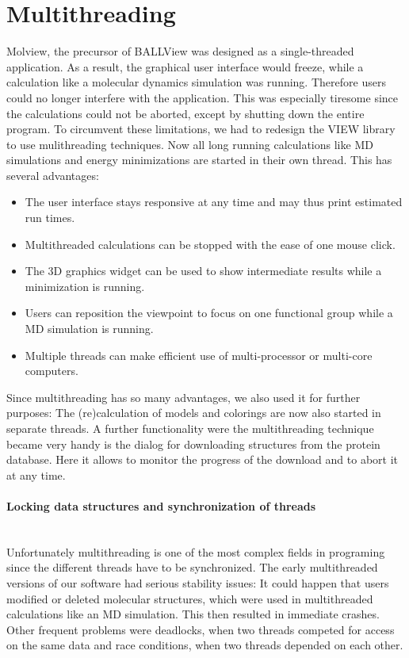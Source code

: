 \section{Multithreading}\label{mthread}
Molview, the precursor of BALLView was designed as a single-threaded 
application. As a result, the graphical user interface would freeze, while a 
calculation like a molecular dynamics simulation was running. Therefore users 
could no longer interfere with the application. This was especially tiresome 
since the calculations could not be aborted, except by shutting down the 
entire program. To circumvent these limitations, we had to redesign the VIEW 
library to use mulithreading techniques. Now all long running calculations 
like MD simulations and energy minimizations are started in their own thread.
This has several advantages:
\begin{itemize}
  \item The user interface stays responsive at any time and may thus \eg print
        estimated run times.
  \item Multithreaded calculations can be stopped with the ease of one mouse
        click.
  \item The 3D graphics widget can be used to show intermediate results \eg 
        while a minimization is running.
  \item Users can reposition the viewpoint \eg to focus on one functional group
        while a MD simulation is running.
  \item Multiple threads can make efficient use of multi-processor or multi-core
        computers.
\end{itemize}

Since multithreading has so many advantages, we also used it for further 
purposes: The (re)calculation of models and colorings are now also started in 
separate threads. A further functionality were the multithreading technique
became very handy is the dialog for downloading structures from the protein 
database. Here it allows to monitor the progress of the download and to abort 
it at any time.

\paragraph{Locking data structures and synchronization of threads}
\hspace*{\fill}\\
Unfortunately multithreading is one of the most complex fields in programing 
since the different threads have to be synchronized. The early multithreaded 
versions of our software had serious stability issues: It could \eg happen
that users modified or deleted molecular structures, which were used in 
multithreaded calculations like an MD simulation. This then resulted in 
immediate crashes. Other frequent problems were deadlocks, when two threads 
competed for access on the same data and race conditions, when two threads 
depended on each other.

